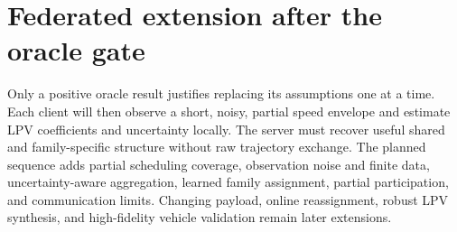 \section{Federated extension after the oracle gate}
Only a positive oracle result justifies replacing its assumptions one at a time.
Each client will then observe a short, noisy, partial speed envelope and estimate
LPV coefficients and uncertainty locally. The server must recover useful shared
and family-specific structure without raw trajectory exchange. The planned
sequence adds partial scheduling coverage, observation noise and finite data,
uncertainty-aware aggregation, learned family assignment, partial participation,
and communication limits. Changing payload, online reassignment, robust LPV
synthesis, and high-fidelity vehicle validation remain later extensions.

